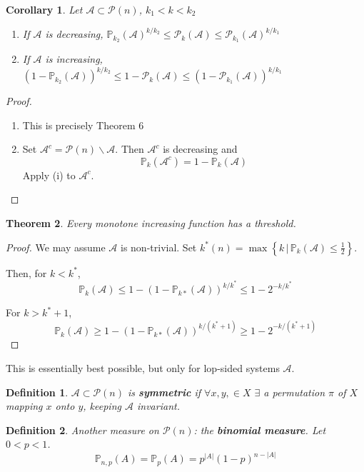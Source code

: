 \documentclass[a4paper]{article}
\newtheorem*{definition}{Definition}
\newtheorem{theorem}{Theorem}
\newtheorem{corollary}[theorem]{Corollary}
\newcommand*\abs[1]{\left|#1\right|}
\begin{document}
\begin{corollary}
	Let $\mathcal{A} \subset \mathcal{P}(n)$, $k_1 < k < k_2$
	\begin{enumerate}[label=\roman*.]
		\item If $\mathcal{A}$ is decreasing,
		$\mathbb{P}_{k_2}(\mathcal{A})^{k/k_2} \leq \mathcal{P}_k(\mathcal{A}) \leq \mathcal{P}_{k_1}(\mathcal{A})^{k/k_1}$
		\item If $\mathcal{A}$ is increasing,
		$(1-\mathbb{P}_{k_2}(\mathcal{A}))^{k/k_2} \leq 1-\mathcal{P}_k(\mathcal{A}) \leq (1-\mathcal{P}_{k_1}(\mathcal{A}))^{k/k_1}$
	\end{enumerate}
\end{corollary}
\begin{proof}
	\begin{enumerate}[label=\roman*.]
		\item This is precisely Theorem 6
		\item Set $\mathcal{A}^c = \mathcal{P}(n)\backslash\mathcal{A}$.
		Then $\mathcal{A}^c$ is decreasing and
		$$\mathbb{P}_k(\mathcal{A}^c) = 1 - \mathbb{P}_k(\mathcal{A})$$
		Apply (i) to $\mathcal{A}^c$.
	\end{enumerate}
\end{proof}

\begin{theorem}
	Every monotone increasing function has a threshold.
\end{theorem}
\begin{proof}
	We may assume $\mathcal{A}$ is non-trivial.
	Set $k^*(n) = \max \left\{k \,|\, \mathbb{P}_k(\mathcal{A}) \leq \frac{1}{2}\right\}$.
	
	Then, for $k < k^*$,
	$$\mathbb{P}_k(\mathcal{A}) \leq 1-(1-\mathbb{P}_{k*}(\mathcal{A}))^{k/k^*} \leq 1-2^{-k/k^*}$$
	
	For $k > k^*+1$,
	$$\mathbb{P}_k(\mathcal{A}) \geq 1-(1-\mathbb{P}_{k*}(\mathcal{A}))^{k/(k^*+1)} \geq 1-2^{-k/(k^*+1)}$$
\end{proof}

This is essentially best possible, but only for lop-sided systems $\mathcal{A}$.

\begin{definition}
	$\mathcal{A} \subset \mathcal{P}(n)$ is \textbf{symmetric} if
	$\forall x,y, \in X$ $\exists$ a permutation $\pi$ of $X$ mapping $x$ onto $y$,
	keeping $\mathcal{A}$ invariant.
\end{definition}

\begin{definition}
	Another measure on $\mathcal{P}(n)$: the \textbf{binomial measure}.
	Let $0<p<1$.
	$$\mathbb{P}_{n,p}(A) = \mathbb{P}_p(A) = p^{\abs{A}}(1-p)^{n-\abs{A}}$$
\end{definition}
\end{document}

